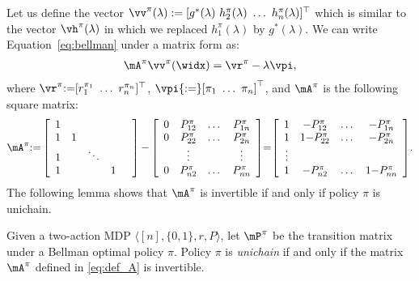 Let us define the vector $\vv^\pi(\lambda):=[ g^*(\lambda)\ h^\pi_2(\lambda)\ \dots\ h^\pi_n(\lambda)]^\top$ which is similar to the vector $\vh^\pi(\lambda)$ in which we replaced $h^\pi_1(\lambda)$ by $g^*(\lambda)$. We can write Equation~\eqref{eq:bellman} under a matrix form as:
\begin{align}
    \mA^{\pi} \vv^\pi(\widx)
    = \vr^{\pi} - \lambda \vpi, \label{eq:pre_lin_eq}
\end{align}
where $\vr^{\pi}{:=}[r^{\pi_1}_1\ \dots\ r^{\pi_n}_n]^\top$, $\vpi{:=}[\pi_1\ \dots\ \pi_n]^\top$, and $\mA^{\pi}$ is the following square matrix:
\begin{align}
    {\mA^{\pi} {:=} \left[\begin{array}{cccccc}
        1 & & & &\\
        1 & 1 &  &\\
        1 & & \ddots & \\
        1 & &  &1\\
    \end{array}
\right] {-}
        \left[\begin{array}{ccccc}
                0 & P_{12}^{\pi} &\dots & P^{\pi}_{1n}\\
                0 & P_{22}^{\pi} &\dots & P^{\pi}_{2n}\\
                  &\vdots&&\vdots\\
                0 & P_{n2}^{\pi} &\dots & P^{\pi}_{nn}\\
        \end{array}
        \right]}
        {=} {\left[\begin{array}{ccccc}
                1 & - P_{12}^{\pi} & \dots & -P_{1n}^{\pi}\\
                1 & 1{-}P_{22}^{\pi} & \dots & -P_{2n}^{\pi}\\
                \vdots\\
                1 &  -P_{n2}^{\pi} & \dots &1{-}P_{nn}^{\pi}
        \end{array}\right]}. \label{eq:def_A}
\end{align}
The following lemma shows that $\mA^\pi$ is invertible if and only if policy $\pi$ is unichain.
\begin{lem}
\label{lem:invertible}
Given a two-action MDP $\langle [n], \{0,1\}, r, P\rangle$, let $\mP^\pi$ be the transition matrix under a Bellman optimal policy $\pi$.
Policy $\pi$ is \emph{unichain} if and only if the matrix $\mA^{\pi}$ defined in \eqref{eq:def_A} is invertible.
\end{lem}
